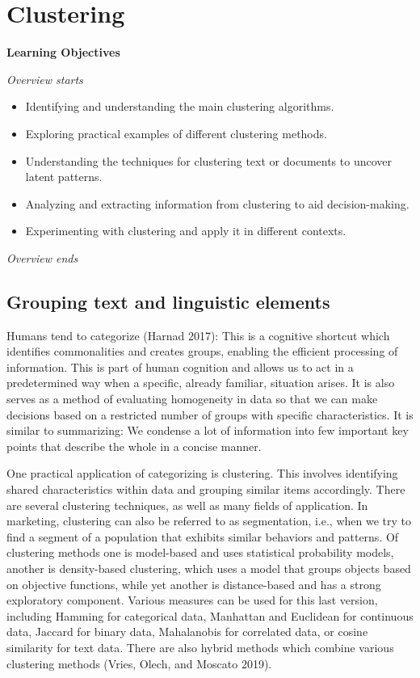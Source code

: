 \chapter{Clustering}\label{clustering}

\textbf{Learning Objectives}

\emph{Overview starts}

\begin{itemize}
\tightlist
\item
  Identifying and understanding the main clustering algorithms.
\item
  Exploring practical examples of different clustering methods.
\item
  Understanding the techniques for clustering text or documents to uncover
  latent patterns.
\item
  Analyzing and extracting information from clustering to aid decision-making.
\item
  Experimenting with clustering and apply it in different
  contexts.
\end{itemize}

\emph{Overview ends}

\section{Grouping text and linguistic
elements}\label{grouping-text-and-linguistic-elements}

Humans tend to categorize (Harnad 2017): This is a cognitive
shortcut which identifies commonalities and creates groups, enabling the efficient processing of
information. This is part of human cognition and
allows us to act in a predetermined way when a specific, already familiar, situation
arises. It is also serves as a method of evaluating homogeneity in data so that we can make decisions based on a restricted number of
groups with specific characteristics. It is similar to summarizing: We
condense a lot of information into few important key points that
describe the whole in a concise manner.

One practical application of categorizing is clustering. This
involves identifying shared characteristics within data and grouping
similar items accordingly. There are several clustering
techniques, as well as many fields of application. In marketing,
clustering can also be referred to as segmentation, i.e., when we try to find a
segment of a population that exhibits similar behaviors and patterns. Of
clustering methods one is model-based
and uses statistical probability models, another is density-based
clustering, which uses a model that groups objects based on objective functions, while yet another is distance-based
and has a strong exploratory component. Various measures can be
used for this last version, including Hamming for categorical data,
Manhattan and Euclidean for continuous data, Jaccard for binary data,
Mahalanobis for correlated data, or cosine similarity for text data.
There are also hybrid methods which combine various
clustering methods (Vries, Olech, and Moscato 2019). 


